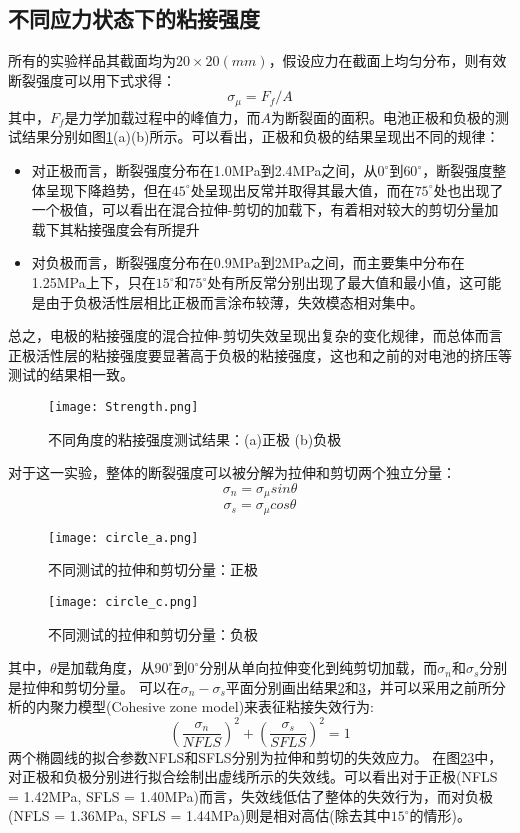 \subsection{不同应力状态下的粘接强度}
所有的实验样品其截面均为$20 \times 20(mm)$，假设应力在截面上均匀分布，则有效断裂强度可以用下式求得：
\begin{equation}
\sigma_{\mu} = F_f/A
\end{equation}
其中，$F_f$是力学加载过程中的峰值力，而$A$为断裂面的面积。电池正极和负极的测试结果分别如图\ref{fig:strength}(a)(b)所示。可以看出，正极和负极的结果呈现出不同的规律：
\begin{itemize}
	\item 对正极而言，断裂强度分布在1.0MPa到2.4MPa之间，从$0^{\circ}$到$60^{\circ}$，断裂强度整体呈现下降趋势，但在$45^{\circ}$处呈现出反常并取得其最大值，而在$75^{\circ}$处也出现了一个极值，可以看出在混合拉伸-剪切的加载下，有着相对较大的剪切分量加载下其粘接强度会有所提升
	\item 对负极而言，断裂强度分布在0.9MPa到2MPa之间，而主要集中分布在1.25MPa上下，只在$15^{\circ}$和$75^{\circ}$处有所反常分别出现了最大值和最小值，这可能是由于负极活性层相比正极而言涂布较薄，失效模态相对集中。
\end{itemize}
总之，电极的粘接强度的混合拉伸-剪切失效呈现出复杂的变化规律，而总体而言正极活性层的粘接强度要显著高于负极的粘接强度，这也和之前的对电池的挤压等测试的结果相一致\cite{Luo2017Mechanical}。
\begin{figure}
\centering   
\texttt{[image: Strength.png]}
\caption{不同角度的粘接强度测试结果：(a)正极 (b)负极} 
\label{fig:strength}
\end{figure}
\indent 对于这一实验，整体的断裂强度可以被分解为拉伸和剪切两个独立分量：
\begin{equation}
\sigma_n =\sigma_{\mu}sin\theta
\end{equation}
\begin{equation}
\sigma_s =\sigma_{\mu}cos\theta
\end{equation}
\begin{figure}
\centering   
\texttt{[image: circle\_a.png]}
\caption{不同测试的拉伸和剪切分量：正极} 
\label{fig:circle_a}
\end{figure}
\begin{figure}
\centering   
\texttt{[image: circle\_c.png]}
\caption{不同测试的拉伸和剪切分量：负极} 
\label{fig:circle_c}
\end{figure}
其中，$\theta$是加载角度，从$90^{\circ}$到$0^{\circ}$分别从单向拉伸变化到纯剪切加载，而$\sigma_n$和$\sigma_s$分别是拉伸和剪切分量。 可以在$\sigma_n - \sigma_s$平面分别画出结果\ref{fig:circle_a}和\ref{fig:circle_c}，并可以采用之前所分析的内聚力模型(Cohesive zone model)来表征粘接失效行为:
\begin{equation}
\left(\frac{\sigma_n}{NFLS} \right)^2 + \left(\frac{\sigma_s}{SFLS} \right)^2 = 1
\end{equation}
两个椭圆线的拟合参数NFLS和SFLS分别为拉伸和剪切的失效应力。 在图\ref{fig:circle_a}\ref{fig:circle_c}中，对正极和负极分别进行拟合绘制出虚线所示的失效线。可以看出对于正极(NFLS = 1.42MPa, SFLS = 1.40MPa)而言，失效线低估了整体的失效行为，而对负极(NFLS = 1.36MPa, SFLS = 1.44MPa)则是相对高估(除去其中$15^{\circ}$的情形)。

